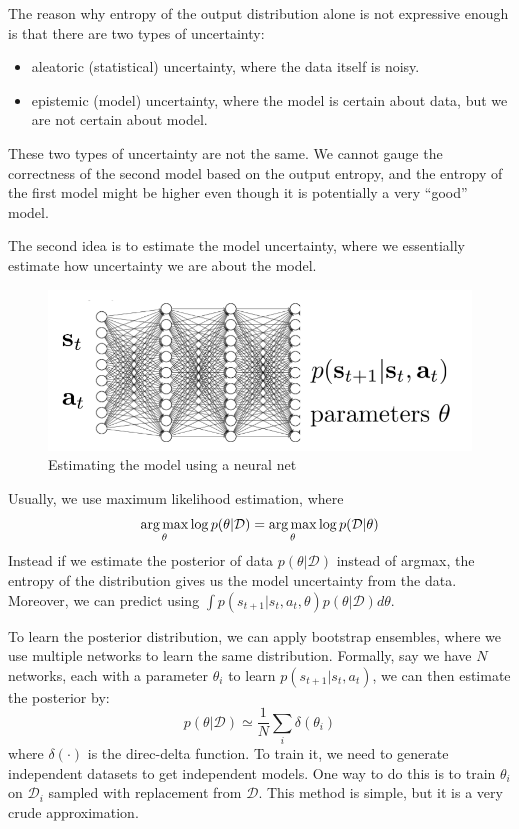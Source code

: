 The reason why entropy of the output distribution alone is not expressive enough is that there are two types of uncertainty:
\begin{itemize}
    \item aleatoric (statistical) uncertainty, where the data itself is noisy.
    \item epistemic (model) uncertainty, where the model is certain about data, but we are not certain about model.
\end{itemize}
These two types of uncertainty are not the same. We cannot gauge the correctness of the second model based on the output entropy, and the entropy of the first model might be higher even though it is potentially a very ``good'' model. 

The second idea is to estimate the model uncertainty, where we essentially estimate how uncertainty we are about the model.
\begin{figure}
    \centering
    \includegraphics[scale=0.5]{figures/modelnn.png}
    \caption{Estimating the model using a neural net}
    \label{fig:modelnn}
\end{figure}
Usually, we use maximum likelihood estimation, where
\[
\operatorname*{arg\,max}_\theta \log p(\theta|\mathcal{D}) = \operatorname*{arg\,max}_\theta \log p(\mathcal{D}|\theta)
\]
Instead if we estimate the posterior of data $p(\theta|\mathcal{D})$ instead of argmax, the entropy of the distribution gives us the model uncertainty from the data. Moreover, we can predict using $\int p(s_{t+1}|s_t,a_t,\theta)p(\theta|\mathcal{D}) d\theta$.

To learn the posterior distribution, we can apply bootstrap ensembles, where we use multiple networks to learn the same distribution. Formally, say we have $N$ networks, each with a parameter $\theta_i$ to learn $p(s_{t+1}|s_t,a_t)$, we can then estimate the posterior by:
\[
p(\theta|\mathcal{D}) \simeq \frac{1}{N}\sum_i \delta(\theta_i)
\]
where $\delta(\cdot)$ is the direc-delta function. To train it, we need to generate independent datasets to get independent models. One way to do this is to train $\theta_i$ on $\mathcal{D}_i$ sampled with replacement from $\mathcal{D}$. This method is simple, but it is a very crude approximation. 

